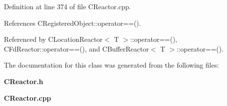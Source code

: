 Definition at line 374 of file CReactor.cpp.

References CRegistered\-Object::operator==().

Referenced by CLocation\-Reactor$<$ T $>$::operator==(), CFd\-Reactor::operator==(), and CBuffer\-Reactor$<$ T $>$::operator==().

The documentation for this class was generated from the following files:\begin{CompactItemize}
\item 
{\bf CReactor.h}\item 
{\bf CReactor.cpp}\end{CompactItemize}
